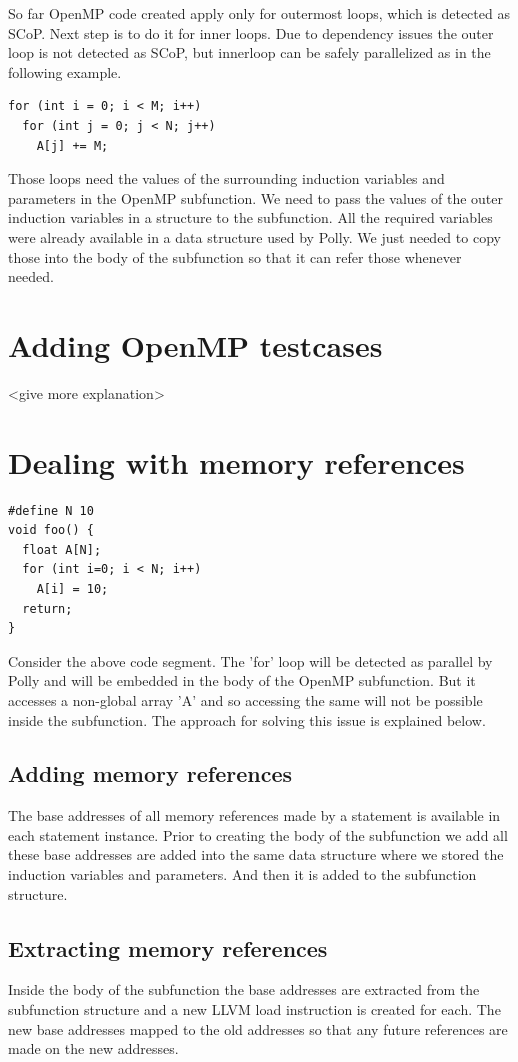 So far OpenMP code created apply only for outermost loops, which is detected as SCoP. Next step is to do it for
inner loops. Due to dependency issues the outer loop is not detected as SCoP, but innerloop can be safely
parallelized as in the following example.
{\footnotesize
\begin{lstlisting}
for (int i = 0; i < M; i++)
  for (int j = 0; j < N; j++)
    A[j] += M;
\end{lstlisting}
}
Those loops need the values of the surrounding induction variables and parameters in the OpenMP subfunction. We need
to pass the values of the outer induction variables in a structure to the subfunction. All the required variables
were already available in a data structure used by Polly. We just needed to copy those into the body of the subfunction
so that it can refer those whenever needed.
\section{Adding OpenMP testcases}

<give more explanation>

\section{Dealing with memory references}
{\footnotesize
\begin{lstlisting}
#define N 10
void foo() {
  float A[N];
  for (int i=0; i < N; i++)
    A[i] = 10;
  return;
}
\end{lstlisting}
}
Consider the above code segment. The 'for' loop will be detected as parallel by Polly and will be embedded in the
body of the OpenMP subfunction. But it accesses a non-global array 'A' and so accessing the same will not be possible inside
the subfunction. The approach for solving this issue is explained below.

\subsection{Adding memory references}

The base addresses of all memory references made by a statement is available in each statement instance. Prior to creating the body
of the subfunction we add all these base addresses are added into the same data structure where we stored the induction variables and parameters.
And then it is added to the subfunction structure.

\subsection{Extracting memory references}

Inside the body of the subfunction the base addresses are extracted from the subfunction structure and a new LLVM load instruction is created for each. The
new base addresses mapped to the old addresses so that any future references are made on the new addresses.

